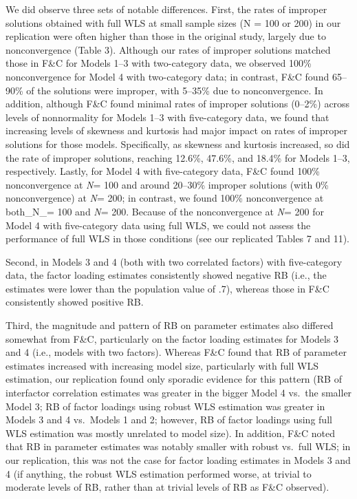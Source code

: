 \documentclass[10,a4paperpaper,]{article}
\begin{document}
We did observe three sets of notable differences. First, the rates of
improper solutions obtained with full WLS at small sample sizes (N = 100
or 200) in our replication were often higher than those in the original
study, largely due to nonconvergence (Table 3). Although our rates of
improper solutions matched those in F\&C for Models 1--3 with
two-category data, we observed 100\% nonconvergence for Model 4 with
two-category data; in contrast, F\&C found 65--90\% of the solutions
were improper, with 5--35\% due to nonconvergence. In addition, although
F\&C found minimal rates of improper solutions (0--2\%) across levels of
nonnormality for Models 1--3 with five-category data, we found that
increasing levels of skewness and kurtosis had major impact on rates of
improper solutions for those models. Specifically, as skewness and
kurtosis increased, so did the rate of improper solutions, reaching
12.6\%, 47.6\%, and 18.4\% for Models 1--3, respectively. Lastly, for
Model 4 with five-category data, F\&C found 100\% nonconvergence at
\emph{N}= 100 and around 20--30\% improper solutions (with 0\%
nonconvergence) at \emph{N}= 200; in contrast, we found 100\%
nonconvergence at both\_N\_= 100 and \emph{N}= 200. Because of the
nonconvergence at \emph{N}= 200 for Model 4 with five-category data
using full WLS, we could not assess the performance of full WLS in those
conditions (see our replicated Tables 7 and 11).

Second, in Models 3 and 4 (both with two correlated factors) with
five-category data, the factor loading estimates consistently showed
negative RB (i.e., the estimates were lower than the population value of
.7), whereas those in F\&C consistently showed positive RB.

Third, the magnitude and pattern of RB on parameter estimates also
differed somewhat from F\&C, particularly on the factor loading
estimates for Models 3 and 4 (i.e., models with two factors). Whereas
F\&C found that RB of parameter estimates increased with increasing
model size, particularly with full WLS estimation, our replication found
only sporadic evidence for this pattern (RB of interfactor correlation
estimates was greater in the bigger Model 4 vs.~the smaller Model 3; RB
of factor loadings using robust WLS estimation was greater in Models 3
and 4 vs.~Models 1 and 2; however, RB of factor loadings using full WLS
estimation was mostly unrelated to model size). In addition, F\&C noted
that RB in parameter estimates was notably smaller with robust vs.~full
WLS; in our replication, this was not the case for factor loading
estimates in Models 3 and 4 (if anything, the robust WLS estimation
performed worse, at trivial to moderate levels of RB, rather than at
trivial levels of RB as F\&C observed).
\end{document}
